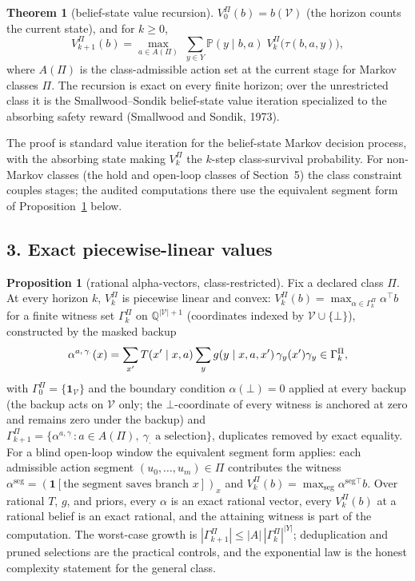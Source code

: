 \documentclass[10pt,twocolumn]{article}
\theoremstyle{definition}
\newtheorem{theorem}{Theorem}
\newtheorem{proposition}{Proposition}
\begin{document}
\begin{theorem}[belief-state value recursion]\label{thm:recursion}
\(V^{\Pi}_{0}(b) = b(\mathcal{V})\) (the horizon counts the current
state), and for \(k \ge 0\),
\[
V^{\Pi}_{k+1}(b) = \max_{a \in A(\Pi)}\; \sum_{y \in Y} \mathbb{P}(y \mid
b, a)\; V^{\Pi}_{k}\bigl(\tau(b, a, y)\bigr),
\]
where \(A(\Pi)\) is the class-admissible action set at the current stage
for Markov classes \(\Pi\). The recursion is exact on every finite
horizon; over the unrestricted class it is the Smallwood--Sondik
belief-state value iteration specialized to the absorbing safety reward
(Smallwood and Sondik, 1973).
\end{theorem}

The proof is standard value iteration for the belief-state Markov decision
process, with the absorbing state making \(V^{\Pi}_{k}\) the \(k\)-step
class-survival probability. For non-Markov classes (the hold and
open-loop classes of Section~5) the class constraint couples stages; the
audited computations there use the equivalent segment form of
Proposition~\ref{prop:pl} below.

\subsection{3. Exact piecewise-linear values}\label{exact}

\begin{proposition}[rational alpha-vectors, class-restricted]\label{prop:pl}
Fix a declared class \(\Pi\). At every horizon \(k\),
\(V^{\Pi}_{k}\) is piecewise linear and convex:
\(V^{\Pi}_{k}(b) = \max_{\alpha \in \Gamma^{\Pi}_{k}} \alpha^{\top} b\)
for a finite witness set \(\Gamma^{\Pi}_{k}\) on
\(\mathbb{Q}^{|\mathcal{V}|+1}\) (coordinates indexed by
\(\mathcal{V} \cup \{\bot\}\)), constructed by the masked backup
\[
\alpha^{a,\,\gamma_{\cdot}}(x) =
\sum_{x'} T(x' \mid x, a) \sum_{y} g(y \mid x, a, x')\, \gamma_{y}(x')\\
\gamma_{y} \in \Gamma^{\Pi}_{k},
\]
with \(\Gamma^{\Pi}_{0} = \{ \mathbf{1}_{\mathcal{V}} \}\) and the
boundary condition \(\alpha(\bot) = 0\) applied at every backup (the
backup acts on \(\mathcal{V}\) only; the \(\bot\)-coordinate of every
witness is anchored at zero and remains zero under the backup) and \(\Gamma^{\Pi}_{k+1} = \{ \alpha^{a, \gamma_{\cdot}}
: a \in A(\Pi),\ \gamma_{\cdot} \text{ a selection} \}\), duplicates
removed by exact equality. For a blind open-loop window the equivalent
segment form applies: each admissible action segment
\((u_{0}, \dots, u_{m}) \in \Pi\) contributes the witness
\(\alpha^{\mathrm{seg}} = (\mathbf{1}[\text{the segment saves branch } x])_{x}\)
and \(V^{\Pi}_{k}(b) = \max_{\mathrm{seg}} \alpha^{\mathrm{seg}\top} b\).
Over rational \(T\), \(g\), and priors, every \(\alpha\) is an exact
rational vector, every \(V^{\Pi}_{k}(b)\) at a rational belief is an exact
rational, and the attaining witness is part of the computation. The
worst-case growth is \(|\Gamma^{\Pi}_{k+1}| \le |A|\,|\Gamma^{\Pi}_{k}|^{|Y|}\);
deduplication and pruned selections are the practical controls, and the
exponential law is the honest complexity statement for the general class.
\end{proposition}
\end{document}
